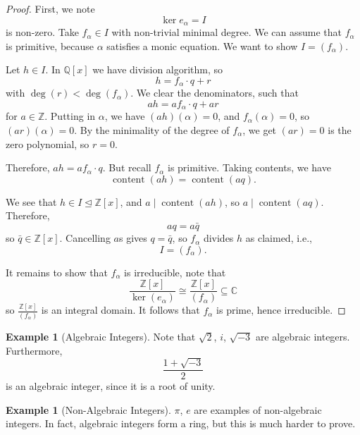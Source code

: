 \documentclass{article}
\theoremstyle{definition}
\newtheorem{example}[theorem]{Example}
\theoremstyle{remark}
\newcommand{\pqty}[1]{\left(#1\right)}
\newcommand{\bqty}[1]{\left[#1\right]}
\newcommand{\flatfrac}[2]{\frac{#1}{#2}}
\newcommand{\isomorphic}{\cong}
\newcommand{\subring}{\subseteq}
\newcommand{\idealsub}{\trianglelefteq}
\newcommand{\divides}{\mid}
\newcommand{\ZZ}{\mathbb{Z}}
\newcommand{\QQ}{\mathbb{Q}}
\newcommand{\CC}{\mathbb{C}}
\newcommand{\content}{\operatorname{content}}
\begin{document}
\begin{proof}
    First, we note
    \[
        \ker e_\alpha = I
    \]
    is non-zero. Take \(f_\alpha \in I\) with non-trivial minimal degree. We can assume that \(f_\alpha\) is primitive, because \(\alpha\) satisfies a monic equation. We want to show \(I = \pqty{f_{\alpha}}\).

    Let \(h \in I\). In \(\QQ\bqty{x}\) we have division algorithm, so
    \[
        h = f_{\alpha} \cdot q + r
    \]
    with \(\deg\pqty{r} < \deg\pqty{f_{\alpha}}\). We clear the denominators, such that
    \[
        ah = af_{\alpha} \cdot q + ar
    \]
    for \(a \in \ZZ\). Putting in \(\alpha\), we have \(\pqty{ah} \pqty{\alpha} = 0\), and \(f_{\alpha} \pqty{\alpha} = 0\), so \(\pqty{ar} \pqty{\alpha} = 0\). By the minimality of the degree of \(f_\alpha\), we get \(\pqty{ar} = 0\) is the zero polynomial, so \(r = 0\).

    Therefore, \(ah = af_{\alpha} \cdot q\). But recall \(f_{\alpha}\) is primitive. Taking contents, we have
    \[
        \content\pqty{ah} = \content\pqty{aq}.
    \]
    
    We see that \(h \in I \idealsub \ZZ\bqty{x}\), and \(a \divides \content\pqty{ah}\), so \(a \divides \content\pqty{aq}\). Therefore,
    \[
        aq = a \bar{q}
    \]
    so \(\bar{q} \in \ZZ\bqty{x}\). Cancelling \(a\)s gives \(q = \bar{q}\), so \(f_\alpha\) divides \(h\) as claimed, i.e.,
    \[
        I = \pqty{f_{\alpha}}.
    \]

    It remains to show that \(f_{\alpha}\) is irreducible, note that
    \[
        \flatfrac{\ZZ\bqty{x}}{\ker\pqty{e_\alpha}} \isomorphic \flatfrac{\ZZ\bqty{x}}{\pqty{f_{\alpha}}} \subring \CC
    \]
    so \(\flatfrac{\ZZ\bqty{x}}{\pqty{f_{\alpha}}}\) is an integral domain. It follows that \(f_\alpha\) is prime, hence irreducible.
\end{proof}

\begin{example}[Algebraic Integers]
    \label{ex:algebraic-int}%
    Note that \(\sqrt{2}\), \(i\), \(\sqrt{-3}\) are algebraic integers. Furthermore, 
    \[
        \frac{1 + \sqrt{-3}}{2}
    \]
    is an algebraic integer, since it is a root of unity.
\end{example}

\begin{example}[Non-Algebraic Integers]
    \label{ex:non-algebraic-int}%
    \(\pi\), \(e\) are examples of non-algebraic integers. In fact, algebraic integers form a ring, but this is much harder to prove.
\end{example}
\end{document}
